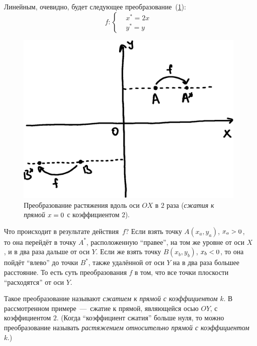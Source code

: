 \documentclass[a4paper,12pt]{article}
\begin{document}
  \begin{example}
    Линейным, очевидно, будет следующее преобразование~(\ref{fig:linear-example}):
    \begin{equation}\label{eq:linear-example}
      f\colon \left\{
        \begin{aligned}
          &x^* = 2x\\
          &y^* = y
        \end{aligned}
      \right.
    \end{equation}
    
    \begin{figure}
      \centering
      
      \includegraphics[width=0.8\columnwidth]{linear-example}
      
      \caption{Преобразование растяжения вдоль оси $OX$ в $2$ раза (\emph{сжатия к прямой} $x \hm= 0$ с коэффициентом $2$).}
      \label{fig:linear-example}
    \end{figure}
    
    Что происходит в результате действия~$f$?
    Если взять точку $A(x_a, y_a)$, $x_a \hm> 0$, то она перейдёт в точку $A^*$, расположенную ``правее'', на том же уровне от оси $X$, и в два раза дальше от оси $Y$.
    Если же взять точку $B(x_b, y_b)$, $x_b \hm< 0$, то она пойдёт ``влево'' до точки $B^*$, также удалённой от оси $Y$ на в два раза большее расстояние.
    То есть суть преобразования $f$ в том, что все точки плоскости ``расходятся'' от оси $Y$.
    
    Такое преобразование называют \emph{сжатием к прямой с коэффициентом $k$}.
    В рассмотренном примере~---~сжатие к прямой, являющейся осью $OY$, с коэффициентом $2$.
    (Когда ``коэффициент сжатия'' больше нуля, то можно преобразование называть \emph{растяжением относительно прямой с коэффициентом $k$}.)
  \end{example}
  
\end{document}
